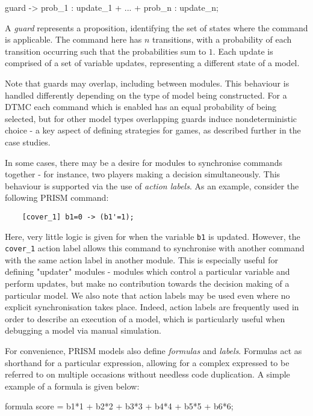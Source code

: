 \begin{verbatim*}
    [] guard -> prob_1 : update_1 + ... + prob_n : update_n;
\end{verbatim*}

A \emph{guard} represents a proposition, identifying the set of states where the command is applicable. The command here has $n$ transitions, with a probability of each transition occurring such that the probabilities sum to $1$. Each update is comprised of a set of variable updates, representing a different state of a model.

Note that guards may overlap, including between modules. This behaviour is handled differently depending on the type of model being constructed. For a DTMC each command which is enabled has an equal probability of being selected, but for other model types overlapping guards induce nondeterministic choice - a key aspect of defining strategies for games, as described further in the case studies.

In some cases, there may be a desire for modules to synchronise commands together - for instance, two players making a decision simultaneously. This behaviour is supported via the use of \emph{action labels}. As an example, consider the following PRISM command:

\begin{verbatim}
    [cover_1] b1=0 -> (b1'=1);
\end{verbatim}

Here, very little logic is given for when the variable \verb+b1+ is updated. However, the \verb+cover_1+ action label allows this command to synchronise with another command with the same action label in another module. This is especially useful for defining "updater" modules - modules which control a particular variable and perform updates, but make no contribution towards the decision making of a particular model. We also note that action labels may be used even where no explicit synchronisation takes place. Indeed, action labels are frequently used in order to describe an execution of a model, which is particularly useful when debugging a model via manual simulation.

For convenience, PRISM models also define \emph{formulas} and \emph{labels}. Formulas act as shorthand for a particular expression, allowing for a complex expressed to be referred to on multiple occasions without needless code duplication. A simple example of a formula is given below:

\begin{verbatim*}
    formula score = b1*1 + b2*2 + b3*3 + b4*4 + b5*5 + b6*6;
\end{verbatim*}

